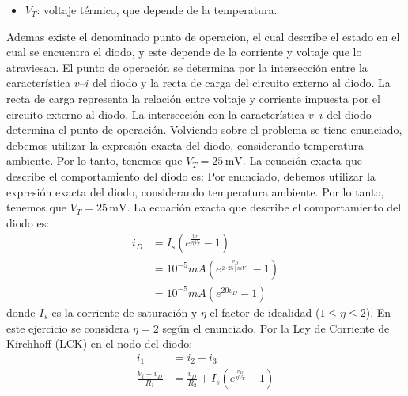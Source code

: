 \documentclass[
  11pt,
  letterpaper,
   addpoints,
   answers
  ]{exam}
\begin{document}
\begin{questions}
\begin{solution}
\begin{itemize}
    \item $V_T$: voltaje térmico, que depende de la temperatura.
\end{itemize}
Ademas existe el denominado punto de operacion, el cual describe el estado en el cual se encuentra el diodo, y este depende de la corriente y voltaje que lo atraviesan. El punto de operación se determina por la intersección entre la característica $v$--$i$ del diodo y la recta de carga del circuito externo al diodo. La recta de carga representa la relación entre voltaje y corriente impuesta por el circuito externo al diodo. La intersección con la característica $v$–$i$ del diodo determina el punto de operación.
Volviendo sobre el problema se tiene enunciado, debemos utilizar la expresión exacta del diodo, considerando temperatura ambiente. Por lo tanto, tenemos que $V_{T}=25\,\mathrm{mV}$. La ecuación exacta que describe el comportamiento del diodo es:
Por enunciado, debemos utilizar la expresión exacta del diodo, considerando temperatura ambiente. Por lo tanto, tenemos que $V_{T}=25\,\mathrm{mV}$. La ecuación exacta que describe el comportamiento del diodo es:
\begin{align}
    i_D &= I_s\left(e^{\frac{v_D}{\eta V_T}} - 1\right) \label{eq:shockley}\\
    &= 10^{-5}mA\left(e^{\frac{v_D}{2 \cdot 25[mV]}} - 1\right)\\
    &=10^{-5}mA(e^{20v_{D}}-1)
\end{align}
donde $I_s$ es la corriente de saturación y $\eta$ el factor de idealidad ($1 \leq \eta \leq 2$). En este ejercicio se considera $\eta = 2$ según el enunciado. Por la Ley de Corriente de Kirchhoff (LCK) en el nodo del diodo:
\begin{align}
    i_1 &= i_2 + i_3 \\
\frac{V_i - v_D}{R_1} &= \frac{v_D}{R_2} + I_s\left(e^{\frac{v_D}{\eta V_T}} - 1\right) \label{eq:kcl}
\end{align}
 

\end{solution}
\end{questions}
\end{document}
